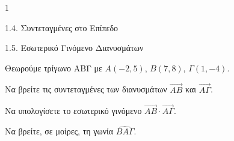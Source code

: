 \begin{ylh}{1}
    \item 1.4. Συντεταγμένες στο Επίπεδο
    \item 1.5. Εσωτερικό Γινόμενο Διανυσμάτων
\end{ylh}
Θεωρούμε τρίγωνο ΑΒΓ με $A(-2,5)$, $B(7,8)$, $\Gamma(1,-4)$.
\begin{alist}
\item Να βρείτε τις συντεταγμένες των διανυσμάτων $\vec{AB}$ και $\vec{A\Gamma}$. 
\item Να υπολογίσετε το εσωτερικό γινόμενο $\vec{AB} \cdot \vec{A\Gamma}$. 
\item Να βρείτε, σε μοίρες, τη γωνία $\widehat{BA\Gamma}$. 
\end{alist}